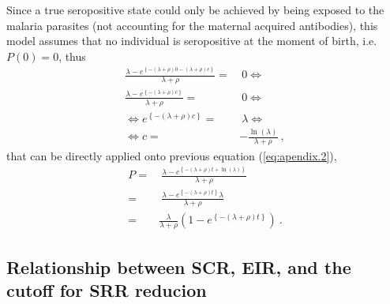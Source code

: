 \begin{appendices}
\noindent
Since a true seropositive state could only be achieved by being exposed to the malaria parasites (not accounting for the maternal acquired antibodies), this model assumes that no individual is seropositive at the moment of birth, i.e. $P(0)=0$, thus
%
\begin{equation}
\begin{split}
    \frac{\lambda - e^{ \left\{-(\lambda+\rho)0-(\lambda+\rho)c\right\}}}{\lambda+\rho} = &\  0 \Leftrightarrow \\
    \frac{\lambda - e^{ \left\{-(\lambda+\rho)c\right\}}}{\lambda+\rho} = &\  0 \Leftrightarrow \\
    \Leftrightarrow e^{ \left\{-(\lambda+\rho)c\right\}} =& \ \lambda \Leftrightarrow \\
    \Leftrightarrow c =& -\frac{\ln(\lambda)}{\lambda+\rho}\ ,
\end{split}
\end{equation}
%
\noindent
that can be directly applied onto previous equation (\ref{eq:apendix.2}),
%
\begin{equation}
\begin{split}
    P =&\  \frac{\lambda - e^{ \left\{ -(\lambda+\rho)t+\ln(\lambda)\right\}}}{\lambda+\rho} \\
    =&\ \frac{\lambda-e^{\left\{ -(\lambda+\rho)t \right\}}\lambda}{\lambda+\rho} \\
    =& \frac{\lambda}{\lambda+\rho}\left(1- e^{\left\{ -(\lambda+\rho)t \right\}}\right)\ .
\end{split}
\end{equation}

\newpage



\subsection{Relationship between SCR, EIR, and the cutoff for SRR reducion}\label{appendix:EIR.and.SCR}


\end{appendices}
